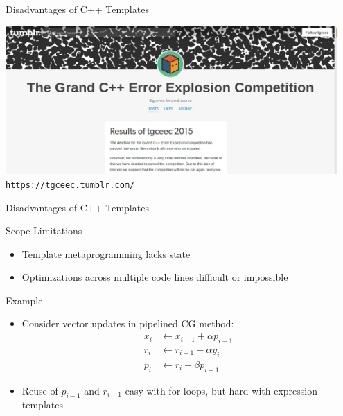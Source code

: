 
\begin{frame}{Disadvantages of C++ Templates}

 \begin{center}
  \includegraphics[width=0.95\textwidth]{figures/code-explosion} \\[0.5em]
  {\scriptsize \texttt{https://tgceec.tumblr.com/}}
 \end{center}

\end{frame}


\begin{frame}{Disadvantages of C++ Templates}

 \begin{block}{Scope Limitations}
  \begin{itemize}
   \item Template metaprogramming lacks state
   \item Optimizations across multiple code lines difficult or impossible
  \end{itemize}
 \end{block}

 \begin{block}{Example}
  \begin{itemize}
   \item Consider vector updates in pipelined CG method:
\begin{align*}
  x_i &\leftarrow x_{i-1} + \alpha  p_{i-1} \\
  r_i &\leftarrow r_{i-1} - \alpha  y_i \\
  p_i &\leftarrow r_i + \beta  p_{i-1}
\end{align*}
  \item Reuse of $p_{i-1}$ and $r_{i-1}$ easy with for-loops, but hard with expression templates

  \end{itemize}
 \end{block}

\end{frame}



